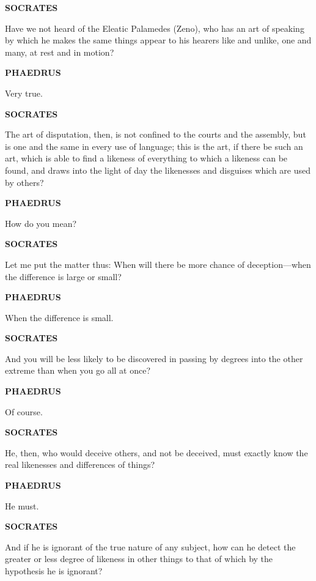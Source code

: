 \documentclass[11pt,letter]{article}
\begin{document}
\par \textbf{SOCRATES}
\par   Have we not heard of the Eleatic Palamedes (Zeno), who has an art of speaking by which he makes the same things appear to his hearers like and unlike, one and many, at rest and in motion?

\par \textbf{PHAEDRUS}
\par   Very true.

\par \textbf{SOCRATES}
\par   The art of disputation, then, is not confined to the courts and the assembly, but is one and the same in every use of language; this is the art, if there be such an art, which is able to find a likeness of everything to which a likeness can be found, and draws into the light of day the likenesses and disguises which are used by others?

\par \textbf{PHAEDRUS}
\par   How do you mean?

\par \textbf{SOCRATES}
\par   Let me put the matter thus:  When will there be more chance of deception—when the difference is large or small?

\par \textbf{PHAEDRUS}
\par   When the difference is small.

\par \textbf{SOCRATES}
\par   And you will be less likely to be discovered in passing by degrees into the other extreme than when you go all at once?

\par \textbf{PHAEDRUS}
\par   Of course.

\par \textbf{SOCRATES}
\par   He, then, who would deceive others, and not be deceived, must exactly know the real likenesses and differences of things?

\par \textbf{PHAEDRUS}
\par   He must.

\par \textbf{SOCRATES}
\par   And if he is ignorant of the true nature of any subject, how can he detect the greater or less degree of likeness in other things to that of which by the hypothesis he is ignorant?
\end{document}
